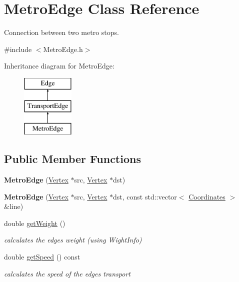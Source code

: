 \hypertarget{class_metro_edge}{}\section{Metro\+Edge Class Reference}
\label{class_metro_edge}


Connection between two metro stops.  




{\ttfamily \#include $<$Metro\+Edge.\+h$>$}

Inheritance diagram for Metro\+Edge\+:\begin{figure}[H]
\begin{center}
\leavevmode
\includegraphics[height=3.000000cm]{class_metro_edge}
\end{center}
\end{figure}
\subsection*{Public Member Functions}
\begin{DoxyCompactItemize}
\item 
\hypertarget{class_metro_edge_acebfc5acd956610cf5dfd5c8dc3b645a}{}{\bfseries Metro\+Edge} (\hyperlink{class_vertex}{Vertex} $\ast$src, \hyperlink{class_vertex}{Vertex} $\ast$dst)\label{class_metro_edge_acebfc5acd956610cf5dfd5c8dc3b645a}

\item 
\hypertarget{class_metro_edge_aebaa11e7a8370e6adc2c525d97c36a1f}{}{\bfseries Metro\+Edge} (\hyperlink{class_vertex}{Vertex} $\ast$src, \hyperlink{class_vertex}{Vertex} $\ast$dst, const std\+::vector$<$ \hyperlink{class_coordinates}{Coordinates} $>$ \&line)\label{class_metro_edge_aebaa11e7a8370e6adc2c525d97c36a1f}

\item 
double \hyperlink{class_metro_edge_abe40bacd0e3d7e72fcdf7d0e38b2b311}{get\+Weight} ()
\begin{DoxyCompactList}\small\item\em calculates the edge\textquotesingle{}s weight (using Wight\+Info) \end{DoxyCompactList}\item 
double \hyperlink{class_metro_edge_a4cba8dae978df61bc931879b7ef2d528}{get\+Speed} () const 
\begin{DoxyCompactList}\small\item\em calculates the speed of the edge\textquotesingle{}s transport \end{DoxyCompactList}\end{DoxyCompactItemize}
